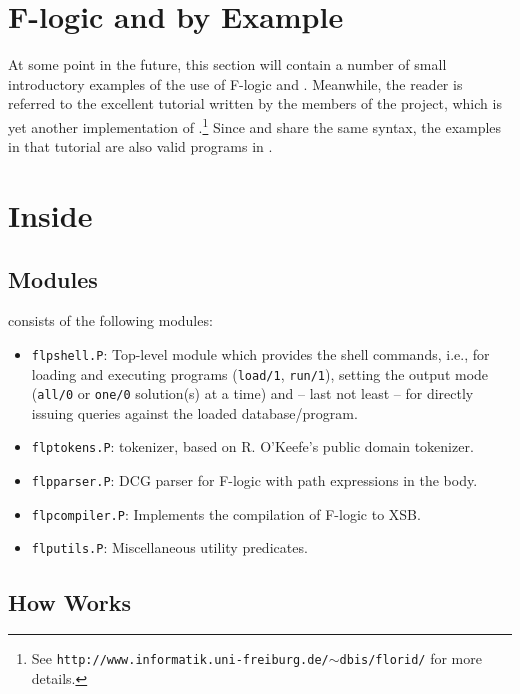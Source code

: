 \section{F-logic and \FLIP by Example}

At some point in the future, this section will contain a number of small
introductory examples of the use of F-logic and \FLIP. Meanwhile, the
reader is referred to the excellent tutorial written by the members of the
\FLORID project, which is yet another implementation of \fl.\footnote{
  See {\tt http://www.informatik.uni-freiburg.de/$\sim$dbis/florid/} for more
  details.
  }
Since \FLIP
and \FLORID share the same syntax, the examples in that tutorial are
also valid programs in \FLIP.



\section{Inside \FLIP}


\subsection{Modules}

\FLIP consists of the following modules:
\begin{itemize}
\item \texttt{flpshell.P}: Top-level module which provides the \FLIP shell
  commands, i.e., for loading and executing \FLIP programs
  (\texttt{load/1}, \texttt{run/1}), setting the output mode
  (\texttt{all/0} or \texttt{one/0} solution(s) at a time) and -- last
  not least -- for directly issuing queries against the loaded
  database/program.
\item \texttt{flptokens.P}: \FLIP tokenizer, based on R. O'Keefe's public
  domain tokenizer.
\item \texttt{flpparser.P}: DCG parser for F-logic with path expressions
  in the body.
\item \texttt{flpcompiler.P}: Implements the compilation of F-logic to
  XSB.
\item \texttt{flputils.P}: Miscellaneous utility predicates.
\end{itemize}



\subsection{How \FLIP Works}



